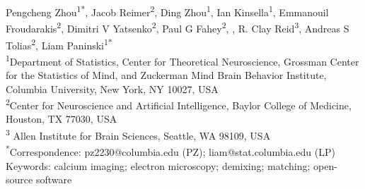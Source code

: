\documentclass[10pt,letterpaper]{article}
\begin{document}
\vspace*{0.35in}

\begin{flushleft}
{\Large
\textbf{}
}
\newline
Pengcheng Zhou\textsuperscript{1*}, 
Jacob Reimer\textsuperscript{2},
Ding Zhou\textsuperscript{1},
Ian Kinsella\textsuperscript{1},
Emmanouil Froudarakis\textsuperscript{2},
Dimitri V Yatsenko\textsuperscript{2},
Paul G Fahey\textsuperscript{2},
, R. Clay Reid\textsuperscript{3},
Andreas S Tolias\textsuperscript{2},
Liam Paninski\textsuperscript{1*}
 \\
\bigskip
\textsuperscript{1}Department of Statistics, Center for Theoretical Neuroscience, Grossman Center for the Statistics of Mind, and Zuckerman Mind Brain Behavior Institute,  Columbia University, New York, NY 10027, USA\\
\textsuperscript{2}Center for Neuroscience and Artificial Intelligence, Baylor College of Medicine, Houston, TX 77030, USA\\
\textsuperscript{3} Allen Institute for Brain Sciences, Seattle, WA 98109, USA \\
\bigskip
\textsuperscript{*}Correspondence: pz2230@columbia.edu (PZ); liam@stat.columbia.edu (LP) \\
\bigskip
Keywords: calcium imaging; electron microscopy; demixing; matching; open-source software
\end{flushleft}
\end{document}

